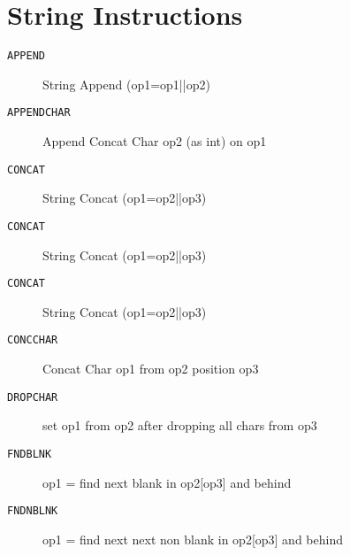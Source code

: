 \section{String Instructions}
\begin{description}
\item[\texttt{APPEND}]  String Append (op1=op1||op2)\\

\end{description}
\begin{description}
\item[\texttt{APPENDCHAR}]  Append Concat Char op2 (as int) on op1\\

\end{description}
\begin{description}
\item[\texttt{CONCAT}]  String Concat (op1=op2||op3)\\

\end{description}
\begin{description}
\item[\texttt{CONCAT}]  String Concat (op1=op2||op3)\\

\end{description}
\begin{description}
\item[\texttt{CONCAT}]  String Concat (op1=op2||op3)\\

\end{description}
\begin{description}
\item[\texttt{CONCCHAR}]  Concat Char op1 from op2 position op3\\

\end{description}
\begin{description}
\item[\texttt{DROPCHAR}]  set op1 from op2 after dropping all chars from op3\\

\end{description}
\begin{description}
\item[\texttt{FNDBLNK}]  op1 = find next blank in op2[op3] and behind\\

\end{description}
\begin{description}
\item[\texttt{FNDNBLNK}]  op1 = find next next non blank in op2[op3] and behind\\

\end{description}
